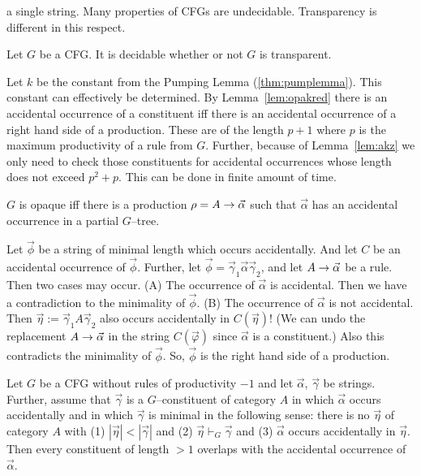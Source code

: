 a single string. Many properties of CFGs
are undecidable. Transparency is different in this respect.
\nocite{fine:transparency}
\begin{thm}[Fine]
Let $G$ be a CFG. It is decidable whether or not
$G$ is transparent.
\end{thm}
\proofbeg
Let $k$ be the constant from the Pumping Lemma (\ref{thm:pumplemma}). 
This constant can effectively be determined. By Lemma~\ref{lem:opakred} 
there is an accidental occurrence of a constituent iff there is
an accidental occurrence of a right hand side of a production.
These are of the length $p + 1$ where $p$ is the maximum
productivity of a rule from $G$. Further, because of Lemma~\ref{lem:akz}
we only need to check those constituents for accidental occurrences
whose length does not exceed $p^2 + p$. This can be done in
finite amount of time.
\proofend
\begin{lem}
\label{lem:opakred}
$G$ is opaque iff there is a production $\rho =
A \rightarrow \vec{\alpha}$ such that $\vec{\alpha}$ has an accidental
occurrence in a partial $G$--tree.
\end{lem}
\proofbeg
Let $\vec{\phi}$ be a string of minimal length which occurs
accidentally. And let $C$ be an accidental occurrence of
$\vec{\phi}$. Further, let $\vec{\phi} = \vec{\gamma}_1 %
\vec{\alpha} \vec{\gamma}_2$, and let  $A \rightarrow \vec{\alpha}$
be a rule. Then two cases may occur.
(A) The occurrence of $\vec{\alpha}$ is accidental.
Then we have a contradiction to the minimality of
$\vec{\phi}$. (B) The occurrence of $\vec{\alpha}$ is not
accidental. Then $\vec{\eta} := \vec{\gamma}_1 A \vec{\gamma}_2$
also occurs accidentally in $C(\vec{\eta})$! (We can undo
the replacement $A \rightarrow \vec{\alpha}$ in the string
$C(\vec{\varphi})$ since $\vec{\alpha}$ is a constituent.)
Also this contradicts the minimality of $\vec{\phi}$. So,
$\vec{\phi}$ is the right hand side of a production.
\proofend
\begin{lem}
Let $G$ be a CFG without rules of productivity
$-1$ and let $\vec{\alpha}$, $\vec{\gamma}$ be strings. Further, 
assume that $\vec{\gamma}$ is a $G$--constituent of category $A$ 
in which $\vec{\alpha}$ occurs accidentally and in which 
$\vec{\gamma}$ is minimal in the following sense: there is no 
$\vec{\eta}$ of category $A$ with (1) $|\vec{\eta}| < |\vec{\gamma}|$ 
and (2) $\vec{\eta} \vdash_G \vec{\gamma}$ and (3) $\vec{\alpha}$ 
occurs accidentally in $\vec{\eta}$. Then every constituent of 
length $> 1$ overlaps with the accidental occurrence of $\vec{\alpha}$.
\end{lem}
